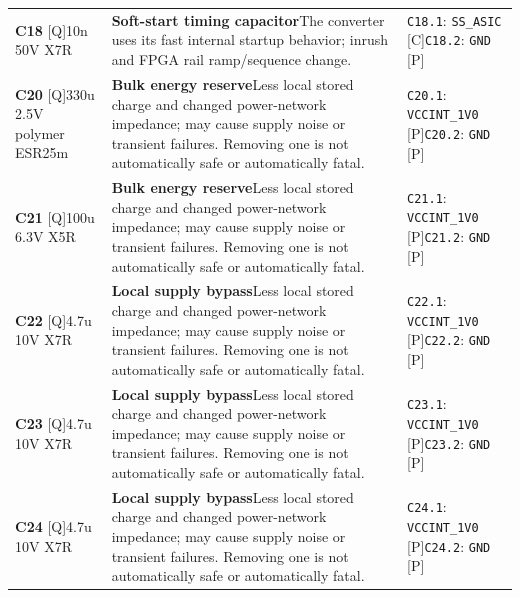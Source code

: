 \documentclass[11pt,a4paper]{article}
\begin{document}
\begin{longtable}{@{}P{27mm}P{77mm}P{62mm}@{}}
\textbf{C18} [Q]\newline 10n 50V X7R & \textbf{Soft-start timing capacitor}\newline The converter uses its fast internal startup behavior; inrush and FPGA rail ramp/sequence change. & \nolinkurl{C18.1}: \nolinkurl{SS_ASIC} [C]\newline \nolinkurl{C18.2}: \nolinkurl{GND} [P] \\
\textbf{C20} [Q]\newline 330u 2.5V polymer ESR25m & \textbf{Bulk energy reserve}\newline Less local stored charge and changed power-network impedance; may cause supply noise or transient failures. Removing one is not automatically safe or automatically fatal. & \nolinkurl{C20.1}: \nolinkurl{VCCINT_1V0} [P]\newline \nolinkurl{C20.2}: \nolinkurl{GND} [P] \\
\textbf{C21} [Q]\newline 100u 6.3V X5R & \textbf{Bulk energy reserve}\newline Less local stored charge and changed power-network impedance; may cause supply noise or transient failures. Removing one is not automatically safe or automatically fatal. & \nolinkurl{C21.1}: \nolinkurl{VCCINT_1V0} [P]\newline \nolinkurl{C21.2}: \nolinkurl{GND} [P] \\
\textbf{C22} [Q]\newline 4.7u 10V X7R & \textbf{Local supply bypass}\newline Less local stored charge and changed power-network impedance; may cause supply noise or transient failures. Removing one is not automatically safe or automatically fatal. & \nolinkurl{C22.1}: \nolinkurl{VCCINT_1V0} [P]\newline \nolinkurl{C22.2}: \nolinkurl{GND} [P] \\
\textbf{C23} [Q]\newline 4.7u 10V X7R & \textbf{Local supply bypass}\newline Less local stored charge and changed power-network impedance; may cause supply noise or transient failures. Removing one is not automatically safe or automatically fatal. & \nolinkurl{C23.1}: \nolinkurl{VCCINT_1V0} [P]\newline \nolinkurl{C23.2}: \nolinkurl{GND} [P] \\
\textbf{C24} [Q]\newline 4.7u 10V X7R & \textbf{Local supply bypass}\newline Less local stored charge and changed power-network impedance; may cause supply noise or transient failures. Removing one is not automatically safe or automatically fatal. & \nolinkurl{C24.1}: \nolinkurl{VCCINT_1V0} [P]\newline \nolinkurl{C24.2}: \nolinkurl{GND} [P] \\

\end{longtable}
\end{document}

